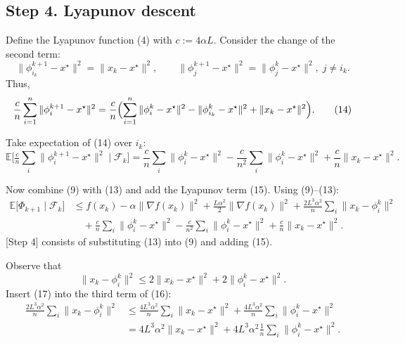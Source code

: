 \documentclass{article}
\newcommand{\E}{\mathbb{E}}
\begin{document}
\subsection*{Step 4. Lyapunov descent}
Define the Lyapunov function (4) with $c:=4\alpha L$.
Consider the change of the second term:
\[
\| \phi_{i_k}^{k+1}-x^{\star}\|^{2}
= \|x_k-x^{\star}\|^{2},
\qquad
\| \phi_{j}^{k+1}-x^{\star}\|^{2}
= \| \phi_{j}^{k}-x^{\star}\|^{2},\; j\neq i_k .
\]
Thus,
\[
\frac{c}{n}\sum_{i=1}^{n}\| \phi_i^{k+1}-x^{\star}\|^{2}
= \frac{c}{n}\Bigl(\sum_{i=1}^{n}\| \phi_i^{k}-x^{\star}\|^{2}
   -\| \phi_{i_k}^{k}-x^{\star}\|^{2}
   +\|x_k-x^{\star}\|^{2}\Bigr). \tag{14}
\]

Take expectation of (14) over $i_k$:
\[
\E\!\bigl[ \tfrac{c}{n}\sum_{i}\|\phi_i^{k+1}-x^{\star}\|^{2}\mid\mathcal{F}_k\bigr]
= \frac{c}{n}\sum_{i}\|\phi_i^{k}-x^{\star}\|^{2}
   -\frac{c}{n^{2}}\sum_{i}\|\phi_i^{k}-x^{\star}\|^{2}
   +\frac{c}{n}\|x_k-x^{\star}\|^{2}. \tag{15}
\]

Now combine (9) with (13) and add the Lyapunov term (15). Using (9)–(13):
\begin{align}
\E\!\bigl[\Phi_{k+1}\mid\mathcal{F}_k\bigr]
&\le f(x_k)-\alpha\|\nabla f(x_k)\|^{2}
   +\frac{L\alpha^{2}}{2}\|\nabla f(x_k)\|^{2}
   +\frac{2L^{3}\alpha^{2}}{n}\sum_{i}\|x_k-\phi_i^{k}\|^{2} \nonumber\\
&\quad +\frac{c}{n}\sum_{i}\|\phi_i^{k}-x^{\star}\|^{2}
   -\frac{c}{n^{2}}\sum_{i}\|\phi_i^{k}-x^{\star}\|^{2}
   +\frac{c}{n}\|x_k-x^{\star}\|^{2}. \tag{16}
\end{align}
[Step 4] consists of substituting (13) into (9) and adding (15).

Observe that
\[
\|x_k-\phi_i^{k}\|^{2}
\le 2\|x_k-x^{\star}\|^{2}+2\|\phi_i^{k}-x^{\star}\|^{2} . \tag{17}
\]
Insert (17) into the third term of (16):
\begin{align}
\frac{2L^{3}\alpha^{2}}{n}\sum_{i}\|x_k-\phi_i^{k}\|^{2}
&\le \frac{4L^{3}\alpha^{2}}{n}\sum_{i}\|x_k-x^{\star}\|^{2}
   +\frac{4L^{3}\alpha^{2}}{n}\sum_{i}\|\phi_i^{k}-x^{\star}\|^{2} \nonumber\\
&= 4L^{3}\alpha^{2}\|x_k-x^{\star}\|^{2}
   +4L^{3}\alpha^{2}\frac{1}{n}\sum_{i}\|\phi_i^{k}-x^{\star}\|^{2}. \tag{18}
\end{align}
\end{document}
